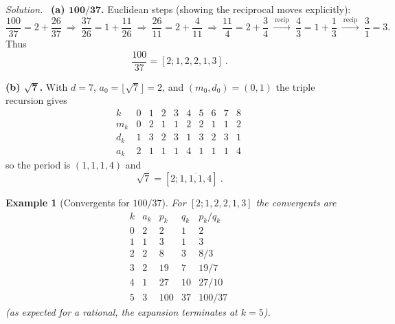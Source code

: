 \documentclass[11pt,a4paper]{article}
\newtheorem{example}{Example}
\theoremstyle{definition}
\theoremstyle{definition}
\theoremstyle{plain}
\theoremstyle{remark}
\newenvironment{solution}{\par\noindent\textit{Solution.}\ }{\par\vspace{0.5em}}
\begin{document}
\begin{solution}
	\textbf{(a) $\boldsymbol{100/37}$.}
	Euclidean steps (showing the reciprocal moves explicitly):
	\[
	\frac{100}{37}=2+\frac{26}{37}\ \Rightarrow\
	\frac{37}{26}=1+\frac{11}{26}\ \Rightarrow\
	\frac{26}{11}=2+\frac{4}{11}\ \Rightarrow\
	\frac{11}{4}=2+\frac{3}{4}\ \xrightarrow{\ \text{recip}\ }\
	\frac{4}{3}=1+\frac{1}{3}\ \xrightarrow{\ \text{recip}\ }\
	\frac{3}{1}=3.
	\]
	Thus
	\[
	\boxed{\ \frac{100}{37}=[2;1,2,2,1,3]\ }.
	\]
	
	\medskip
	\textbf{(b) $\boldsymbol{\sqrt7}$.}
	With $d=7$, $a_0=\lfloor\sqrt7\rfloor=2$, and $(m_0,d_0)=(0,1)$ the triple recursion gives
	\[
	\begin{array}{c|ccccccccc}
		k & 0 & 1 & 2 & 3 & 4 & 5 & 6 & 7 & 8\\ \hline
		m_k & 0 & 2 & 1 & 1 & 2 & 2 & 1 & 1 & 2\\
		d_k & 1 & 3 & 2 & 3 & 1 & 3 & 2 & 3 & 1\\
		a_k & 2 & 1 & 1 & 1 & 4 & 1 & 1 & 1 & 4
	\end{array}
	\]
	so the period is $(1,1,1,4)$ and
	\[
	\boxed{\ \sqrt7=[2;\overline{1,1,1,4}]\ }.
	\]
\end{solution}

\begin{example}[Convergents for $100/37$]
	For $[2;1,2,2,1,3]$ the convergents are
	\[
	\begin{array}{c|c|c|c|c}
		k & a_k & p_k & q_k & p_k/q_k\\ \hline
		0 & 2 & 2  & 1  & 2 \\
		1 & 1 & 3  & 1  & 3 \\
		2 & 2 & 8  & 3  & 8/3 \\
		3 & 2 & 19 & 7  & 19/7 \\
		4 & 1 & 27 & 10 & 27/10 \\
		5 & 3 & 100& 37 & \boxed{100/37}
	\end{array}
	\]
	(as expected for a rational, the expansion terminates at $k=5$).
\end{example}
\end{document}
